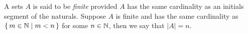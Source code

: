\guard




\begin{defn}
\label{defn:finite}
  A sets $A$ is said to be \emph{finite} provided $A$ has the same cardinality as an initials segment of the naturals.
  Suppose $A$ is finite and has the same cardinality as $\left\{\, m\in\mathbb{N}\mid m<n\,\right\}$ for some $n\in\mathbb{N}$, then we say that $\vert A\vert = n$.
\end{defn}
